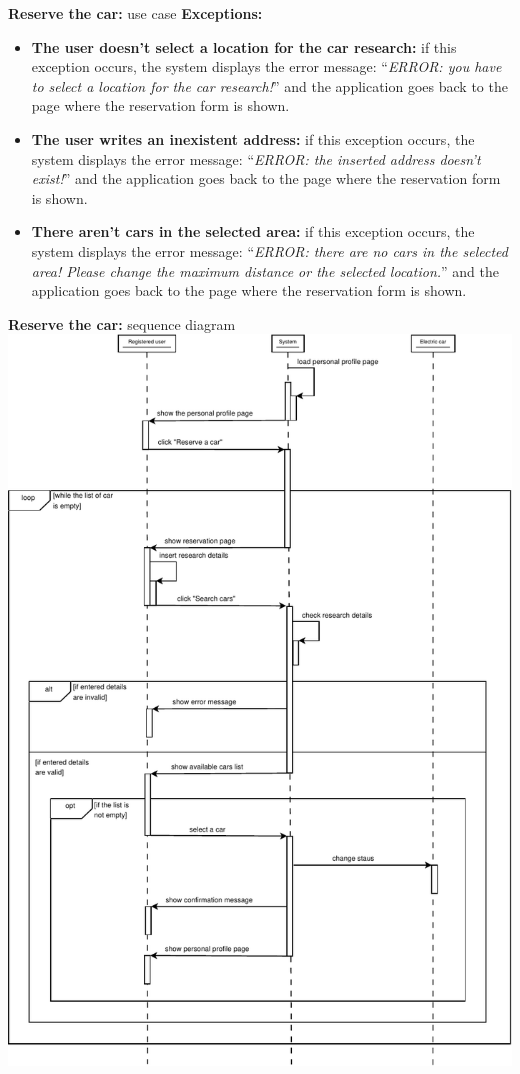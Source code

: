 \documentclass{beamer}
\begin{document}
	\begin{frame}{\textbf{Reserve the car:} use case}
		\textbf{Exceptions:}\\
		\begin{itemize}
			\item \textbf{The user doesn't select a location for the car research:} if this exception occurs, the system displays the error message: ``\textit{ERROR: you have to select a location for the car research!}'' and the application goes back to the page where the reservation form is shown.
			\item \textbf{The user writes an inexistent address:} if this exception occurs, the system displays the error message: ``\textit{ERROR: the inserted address doesn't exist!}'' and the application goes back to the page where the reservation form is shown.
			\item \textbf{There aren't cars in the selected area:} if this exception occurs, the system displays the error message: ``\textit{ERROR: there are no cars in the selected area! Please change the maximum distance or the selected location.}'' and the application goes back to the page where the reservation form is shown.
		\end{itemize}
	\end{frame}

	\begin{frame}{\textbf{Reserve the car:} sequence diagram}
		\includegraphics[height=0.9\textheight]{figures/sdRESERVATION.pdf}
	\end{frame}
\end{document}
